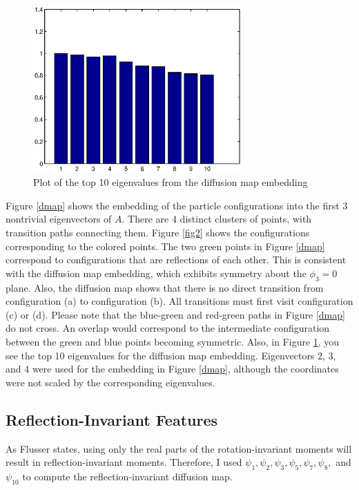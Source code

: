 \begin{figure}[t]
\includegraphics[width=8cm]{evals.eps}
\caption[Eigenvalue spectrum for diffusion maps embedding of Lennard-Jones cluster]{Plot of the top 10 eigenvalues from the diffusion map embedding}
\label{evals}
\end{figure}

Figure \ref{dmap} shows the embedding of the particle configurations into the first 3 nontrivial eigenvectors of $A$. There are 4 distinct clusters of points, with transition paths connecting them. Figure \ref{fig2} shows the configurations corresponding to the colored points. The two green points in Figure \ref{dmap} correspond to configurations that are reflections of each other. This is consistent with the diffusion map embedding, which exhibits symmetry about the $\phi_3=0$ plane. Also, the diffusion map shows that there is no direct transition from configuration (a) to configuration (b). All transitions must first visit configuration (c) or (d). Please note that the blue-green and red-green paths in Figure \ref{dmap} do not cross. An overlap would correspond to the intermediate configuration  between the green and blue points becoming symmetric. Also, in Figure \ref{evals}, you see the top 10 eigenvalues for the diffusion map embedding. Eigenvectors 2, 3, and 4 were used for the embedding in Figure \ref{dmap}, although the coordinates were not scaled by the corresponding eigenvalues. 

\subsection{Reflection-Invariant Features}

As Flusser states, using only the real parts of the rotation-invariant moments will result in reflection-invariant moments. Therefore, I used $\psi_1,\psi_2, \psi_3,\psi_5,\psi_7,\psi_8,$ and $\psi_{10}$ to compute the reflection-invariant diffusion map.

